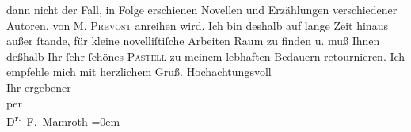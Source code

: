 \begin{ledgroupsized}[t]{13cm}
{{{                  dann nicht der Fall, in Folge erschienen Novellen und Erzählungen verschiedener
                  Autoren.}}}\label{K_L00311-1h} von \textsc{M. Prevost} anreihen wird. Ich bin deshalb auf lange Zeit hinaus außer ſtande, für kleine
               novelliſtiſche Arbeiten Raum zu finden u. muß Ihnen deßhalb Ihr ſehr ſchönes \textsc{Pastell} zu meinem lebhaften Bedauern retournieren. Ich empfehle mich mit herzlichem
               Gruß.\pend
           \pstart
           Hochachtungsvoll{\\[\baselineskip]}Ihr ergebener{\\[\baselineskip]}per{\\[\baselineskip]}\spacefill\mbox{D\textsuperscript{r.} F. Mamroth}\pend
           \leftskip=0em{}
         
         \endnumbering{}\end{ledgroupsized}  \newcommand{\dateiname}{L00311}\newcommand{\titel}{Fedor Mamroth an Arthur Schnitzler, 4. 4. 1894}\newcommand{\editorInnen}{Martin Anton Müller und Gerd-Hermann Susen}
      